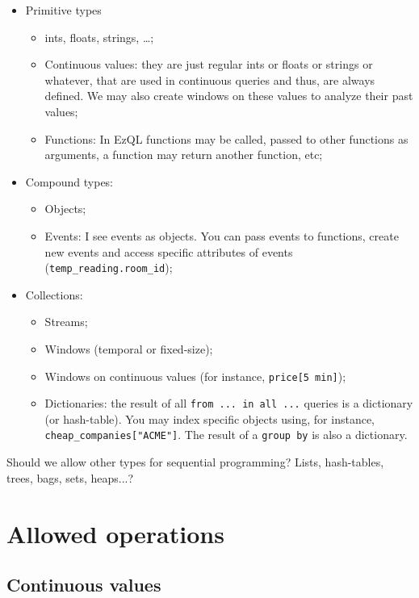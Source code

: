 \documentclass{report}
\begin{document}
\begin{itemize}
\item Primitive types
  \begin{itemize}
  \item ints, floats, strings, \ldots;
  \item Continuous values: they are just regular ints or floats or
    strings or whatever, that are used in continuous queries and thus,
    are always defined. We may also create windows on these values to
    analyze their past values;
  \item Functions: In EzQL functions may be called, passed to other
    functions as arguments, a function may return another function,
    etc;
  \end{itemize}
\item Compound types:
  \begin{itemize}
  \item Objects;
  \item Events: I see events as objects. You can pass events to
    functions, create new events and access specific attributes of
    events (\verb=temp_reading.room_id=);
  \end{itemize}
\item Collections:
  \begin{itemize}
  \item Streams;
  \item Windows (temporal or fixed-size);
  \item Windows on continuous values (for instance,
    \verb=price[5 min]=);
  \item Dictionaries: the result of all \verb=from ... in all ...=
    queries is a dictionary (or hash-table). You may index specific
    objects using, for instance, \verb=cheap_companies["ACME"]=. The
    result of a \verb=group by= is also a dictionary.
  \end{itemize}
\end{itemize}

Should we allow other types for sequential programming? Lists,
hash-tables, trees, bags, sets, heaps...?

\section{Allowed operations}

\subsection{Continuous values}
\end{document}

